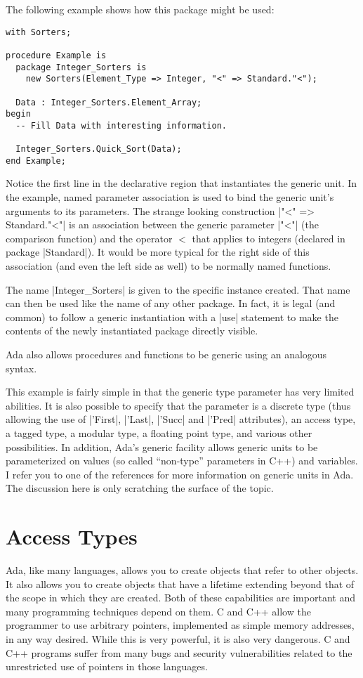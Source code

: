 The following example shows how this package might be used:

\begin{lstlisting}
with Sorters;

procedure Example is
  package Integer_Sorters is
    new Sorters(Element_Type => Integer, "<" => Standard."<");

  Data : Integer_Sorters.Element_Array;
begin
  -- Fill Data with interesting information.

  Integer_Sorters.Quick_Sort(Data);
end Example;
\end{lstlisting}

Notice the first line in the declarative region that instantiates the generic unit. In the
example, named parameter association is used to bind the generic unit's arguments to its
parameters. The strange looking construction |"<" => Standard."<"| is an association between the
generic parameter |"<"| (the comparison function) and the operator $<$ that applies to integers
(declared in package |Standard|). It would be more typical for the right side of this
association (and even the left side as well) to be normally named functions.

The name |Integer_Sorters| is given to the specific instance created. That name can then be used
like the name of any other package. In fact, it is legal (and common) to follow a generic
instantiation with a |use| statement to make the contents of the newly instantiated package
directly visible.

Ada also allows procedures and functions to be generic using an analogous syntax.

This example is fairly simple in that the generic type parameter has very limited abilities. It
is also possible to specify that the parameter is a discrete type (thus allowing the use of
|'First|, |'Last|, |'Succ| and |'Pred| attributes), an access type, a tagged type, a modular
type, a floating point type, and various other possibilities. In addition, Ada's generic
facility allows generic units to be parameterized on values (so called ``non-type'' parameters
in C++) and variables. I refer you to one of the references for more information on generic
units in Ada. The discussion here is only scratching the surface of the topic.

\section{Access Types}

Ada, like many languages, allows you to create objects that refer to other objects. It also
allows you to create objects that have a lifetime extending beyond that of the scope in which
they are created. Both of these capabilities are important and many programming techniques
depend on them. C and C++ allow the programmer to use arbitrary pointers, implemented as simple
memory addresses, in any way desired. While this is very powerful, it is also very dangerous. C
and C++ programs suffer from many bugs and security vulnerabilities related to the unrestricted
use of pointers in those languages.

